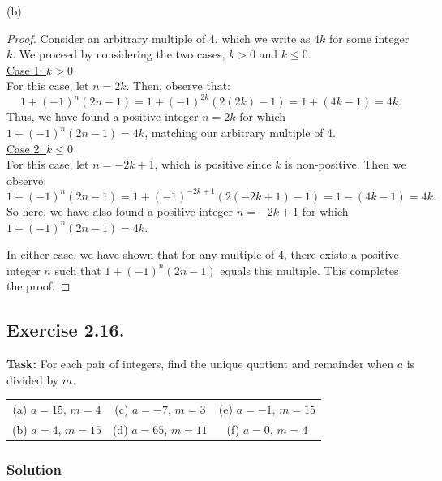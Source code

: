 \documentclass{article}
\begin{document}
\noindent (b)

\begin{proof} Consider an arbitrary multiple of 4, which we write as $4k$ for some integer $k$. We proceed by considering the two cases, $k > 0$ and $k \leq 0$.\\
    
     \underline{Case 1: $k > 0$} \\
    For this case, let $n = 2k$. Then, observe that:
    \[
    1 + (-1)^n(2n - 1) = 1 + (-1)^{2k}(2(2k) - 1) = 1 + (4k - 1) = 4k.
    \]
    Thus, we have found a positive integer $n = 2k$ for which $1 + (-1)^n(2n - 1) = 4k$, matching our arbitrary multiple of 4.\\
    
    \underline{Case 2: $k \leq 0$} \\
    For this case, let $n = -2k + 1$, which is positive since $k$ is non-positive. Then we observe:
    \[
    1 + (-1)^n(2n - 1) = 1 + (-1)^{-2k+1}(2(-2k + 1) - 1) = 1 - (4k - 1) = 4k.
    \]
    So here, we have also found a positive integer $n = -2k + 1$ for which $1 + (-1)^n(2n - 1) = 4k$.
    
    In either case, we have shown that for any multiple of 4, there exists a positive integer $n$ such that $1 + (-1)^n(2n - 1)$ equals this multiple. This completes the proof.
\end{proof}

\newpage

\subsection{Exercise 2.16.}
\textbf{Task:} For each pair of integers, find the unique quotient and remainder when $a$ is divided by $m$.\\

\begin{center}
    \begin{tabular}{ccc}
        (a) $a = 15$, $m = 4$ & (c) $a = -7$, $m = 3$ & (e) $a = -1$, $m = 15$ \\
        (b) $a = 4$, $m = 15$ & (d) $a = 65$, $m = 11$ & (f) $a = 0$, $m = 4$ \\
    \end{tabular}
\end{center}

\subsubsection*{Solution}
\end{document}
